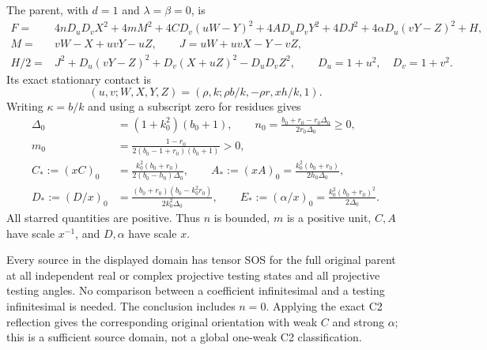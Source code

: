 The parent, with $d=1$ and $\lambda=\beta=0$, is
\begin{align*}
 F={}&4nD_uD_vX^2+4mM^2+4CD_v(uW-Y)^2+4AD_uD_vY^2
                +4DJ^2+4\alpha D_u(vY-Z)^2+H,\\
 M={}&vW-X+uvY-uZ,\qquad J=uW+uvX-Y-vZ,\\
 H/2={}&J^2+D_u(vY-Z)^2+D_v(X+uZ)^2-D_uD_vZ^2,
 \qquad D_u=1+u^2,\quad D_v=1+v^2.
\end{align*}
Its exact stationary contact is
\[
 (u,v;W,X,Y,Z)=(\rho,k;\rho b/k,-\rho r,xh/k,1).
\]
Writing $\kappa=b/k$ and using a subscript zero for residues gives
\begin{align*}
 \Delta_0&=(1+k_0^2)(b_0+1),\qquad
 n_0=\frac{b_0+r_0-r_0\Delta_0}{2r_0\Delta_0}\geq0,\\
 m_0&=\frac{1-r_0}{2(b_0-1+r_0)(b_0+1)}>0,\\
 C_*:=(xC)_0&=\frac{k_0^2(b_0+r_0)}{2(b_0-h_0)\Delta_0},\qquad
 A_*:=(xA)_0=\frac{k_0^2(b_0+r_0)}{2h_0\Delta_0},\\
 D_*:=(D/x)_0&=\frac{(b_0+r_0)(b_0-k_0^2r_0)}{2k_0^2\Delta_0},\qquad
 E_*:=(\alpha/x)_0=\frac{k_0^2(b_0+r_0)^2}{2\Delta_0}.
\end{align*}
All starred quantities are positive.  Thus $n$ is bounded, $m$ is a
positive unit, $C,A$ have scale $x^{-1}$, and $D,\alpha$ have scale $x$.

\begin{theorem}
\label{thm:c2-general-single-angle}
Every source in the displayed domain has tensor SOS for the full
original parent at all independent real or complex projective testing
states and all projective testing angles.  No comparison between a
coefficient infinitesimal and a testing infinitesimal is needed.
The conclusion includes $n=0$.  Applying the exact C2 reflection gives
the corresponding original orientation with weak $C$ and strong
$\alpha$; this is a sufficient source domain, not a global one-weak
C2 classification.
\end{theorem}

